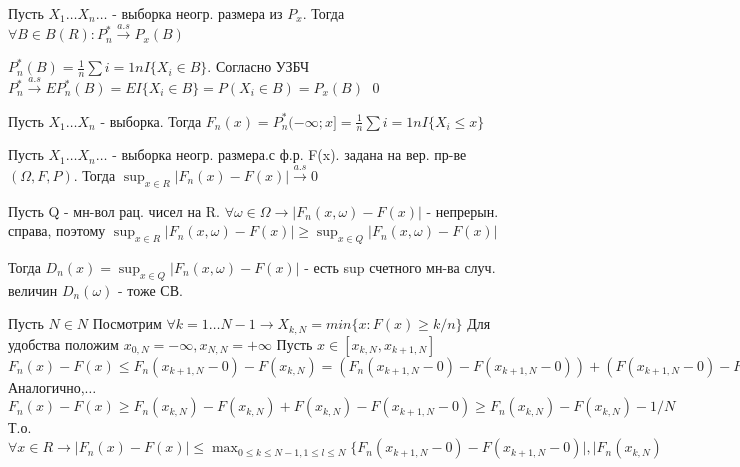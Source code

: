	\begin{statement}
		Пусть $X_1 \ldots X_n \ldots$ - выборка неогр. размера из $P_x$.
		Тогда $\forall B \in B(R): P_n^*\xrightarrow{a.s}P_x(B)$
		
		\proof
		$P_n^*(B) = \frac{1}{n} \sum{i=1}{n}I\{X_i \in B\}$.
		Согласно УЗБЧ $P_n^* \xrightarrow{a.s} EP^*_n (B) = EI\{X_i \in B\} = P(X_i \in B) = P_x(B)$
		\qed 
	\end{statement}
	
	\begin{definition}
		Пусть $X_1 \ldots X_n$ - выборка. Тогда 
		$F_n(x) = P_n^*(-\infty; x] = \frac{1}{n}\sum{i=1}{n}I\{X_i \le x\}$
	\end{definition}
	
	\begin{theorem}
		Пусть $X_1 \ldots X_n \ldots$ - выборка неогр. размера.с ф.р. F(x). задана на вер.  пр-ве $(\Omega, F, P)$.
		Тогда $\sup_{x \in R} |F_n(x) - F(x)| \xrightarrow{a.s} 0$
		
		\proof
		Пусть Q - мн-вол рац. чисел на R. $\forall \omega \in\Omega \longrightarrow |F_n(x,\omega)-F(x)|$ - непрерын. справа, поэтому 
		$\sup_{x\in R} |F_n(x,\omega)-F(x)| \ge \sup_{x\in Q} |F_n(x,\omega)-F(x)|$
		
		Тогда $D_n(x) = \sup_{x\in Q} |F_n(x,\omega) - F(x)|$ - есть sup счетного мн-ва случ. величин $D_n(\omega)$ - тоже СВ.
		
		Пусть $N \in N$ Посмотрим $\forall k=1 \ldots N-1 \longrightarrow X_{k,N} = min\{x:F(x) \ge k/n\}$
		Для удобства положим $x_{0,N} = -\infty, x_{N,N} = +\infty$
		Пусть $x \in [x_{k,N},x_{k+1,N}]$
		$F_n(x)-F(x) \le F_n(x_{k+1,N} - 0) - F(x_{k,N}) = (F_n(x_{k+1,N} - 0) - F(x_{k+1,N} - 0)) + (F(x_{k+1,N}-0) - F(x_{k,N}))$
		Аналогично,$\ldots$
		$F_n(x)-F(x) \ge F_n(x_{k,N}) - F(x_{k,N}) + F(x_{k,N}) - F(x_{k+1,N} - 0) \ge F_n(x_{k,N}) - F(x_{k,N}) - 1/N$
		Т.о. $\forall x \in R \longrightarrow |F_n(x) - F(x)| \le \max_{0 \le k \le N-1, 1 \le l \le N}\{F_n(x_{k+1,N} -0) - F(x_{k+1,N} - 0)|, |F_n(x_{k,N})$
	\end{theorem}